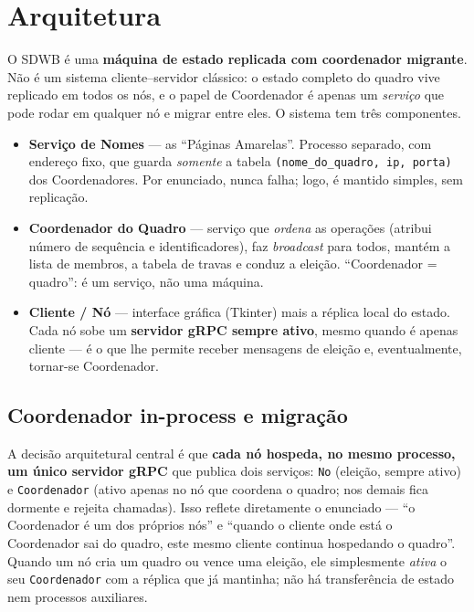 \section{Arquitetura}
\label{sec:arquitetura}

O SDWB é uma \textbf{máquina de estado replicada com coordenador migrante}. Não é um
sistema cliente--servidor clássico: o estado completo do quadro vive replicado em todos os
nós, e o papel de Coordenador é apenas um \emph{serviço} que pode rodar em qualquer nó e
migrar entre eles. O sistema tem três componentes.

\begin{itemize}
  \item \textbf{Serviço de Nomes} --- as ``Páginas Amarelas''. Processo separado, com
        endereço fixo, que guarda \emph{somente} a tabela
        \texttt{(nome\_do\_quadro, ip, porta)} dos Coordenadores. Por enunciado, nunca
        falha; logo, é mantido simples, sem replicação.
  \item \textbf{Coordenador do Quadro} --- serviço que \emph{ordena} as operações (atribui
        número de sequência e identificadores), faz \emph{broadcast} para todos, mantém a
        lista de membros, a tabela de travas e conduz a eleição. ``Coordenador = quadro'':
        é um serviço, não uma máquina.
  \item \textbf{Cliente / Nó} --- interface gráfica (Tkinter) mais a réplica local do
        estado. Cada nó sobe um \textbf{servidor gRPC sempre ativo}, mesmo quando é apenas
        cliente --- é o que lhe permite receber mensagens de eleição e, eventualmente,
        tornar-se Coordenador.
\end{itemize}

\subsection{Coordenador in-process e migração}

A decisão arquitetural central é que \textbf{cada nó hospeda, no mesmo processo, um único
servidor gRPC} que publica dois serviços: \texttt{No} (eleição, sempre ativo) e
\texttt{Coordenador} (ativo apenas no nó que coordena o quadro; nos demais fica dormente e
rejeita chamadas). Isso reflete diretamente o enunciado --- ``o Coordenador é um dos
próprios nós'' e ``quando o cliente onde está o Coordenador sai do quadro, este mesmo
cliente continua hospedando o quadro''. Quando um nó cria um quadro ou vence uma eleição,
ele simplesmente \emph{ativa} o seu \texttt{Coordenador} com a réplica que já mantinha; não
há transferência de estado nem processos auxiliares.

